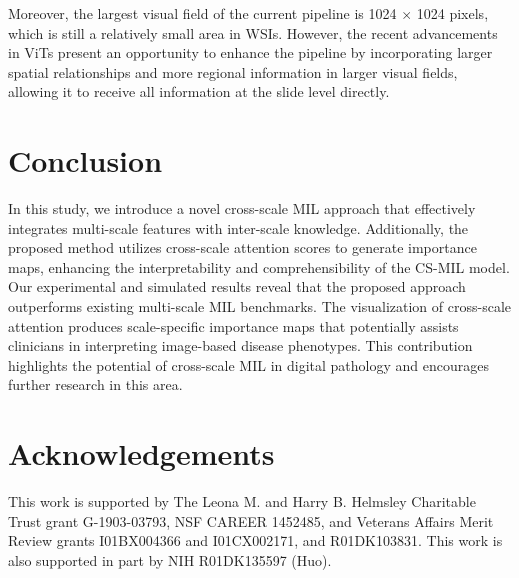 \documentclass[times,twocolumn,final]{elsarticle}
\begin{document}
Moreover, the largest visual field of the current pipeline is 1024 $\times$ 1024 pixels, which is still a relatively small area in WSIs. However, the recent advancements in ViTs present an opportunity to enhance the pipeline by incorporating larger spatial relationships and more regional information in larger visual fields, allowing it to receive all information at the slide level directly.

\section{Conclusion}

In this study, we introduce a novel cross-scale MIL approach that effectively integrates multi-scale features with inter-scale knowledge. Additionally, the proposed method utilizes cross-scale attention scores to generate importance maps, enhancing the interpretability and comprehensibility of the CS-MIL model. Our experimental and simulated results reveal that the proposed approach outperforms existing multi-scale MIL benchmarks. The visualization of cross-scale attention produces scale-specific importance maps that potentially assists clinicians in interpreting image-based disease phenotypes. This contribution highlights the potential of cross-scale MIL in digital pathology and encourages further research in this area.


\section{Acknowledgements}
This work is supported by The Leona M. and Harry B. Helmsley Charitable Trust grant G-1903-03793, NSF CAREER 1452485, and Veterans Affairs Merit Review grants I01BX004366 and I01CX002171, and R01DK103831. This work is also supported in part by NIH R01DK135597 (Huo).


{}



\appendix

\newpage
 \renewcommand{\thesection}{\Alph{section}}%
 
\end{document}
